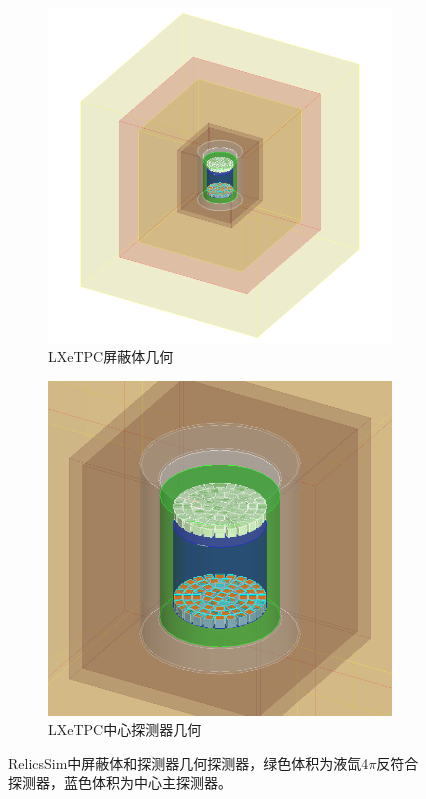 \begin{figure}
  \begin{subfigure}{.5\textwidth}
    \centering
    \includegraphics[width=1.0\linewidth]{figures/relics_outer.png}
    \caption{\label{fig:relics_outer} LXeTPC屏蔽体几何}
  \end{subfigure}
  \begin{subfigure}{.5\textwidth}
    \centering
    \includegraphics[width=1.0\linewidth]{figures/relics_inner.png}
    \caption{\label{fig:relics_inner} LXeTPC中心探测器几何}
  \end{subfigure}
  \caption{\label{fig:relics_g4} RelicsSim中屏蔽体和探测器几何探测器，绿色体积为液氙4$\pi$反符合探测器，蓝色体积为中心主探测器。}
\end{figure}

